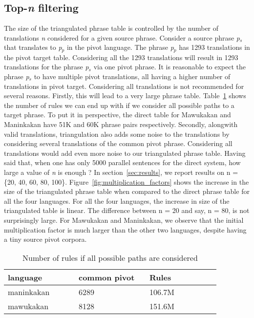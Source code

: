 \subsection{Top-\emph{n} filtering}
\label{subsec:topn}
 The size of the triangulated phrase table is controlled by the number of translations \emph{n} considered for a given source phrase. Consider a source phrase \emph{p$_s$} that translates to \emph{p$_p$} in the pivot language. The phrase \emph{p$_p$} has 1293 translations in the pivot target table. Considering all the 1293 translations will result in 1293 translations for the phrase \emph{p$_s$} via one pivot phrase. It is reasonable to expect the phrase \emph{p$_s$} to have multiple pivot translations, all having a higher number of translations in pivot target. Considering all translations is not recommended for several reasons. Firstly, this will lead to a very large phrase table. Table~\ref{table:allrules} shows the number of rules we can end up with if we consider all possible paths to a target phrase. To put it in perspective, the direct table for Mawukakan and Maninkakan have 51K and 60K phrase pairs respectively. Secondly, alongwith valid translations, triangulation also adds some noise to the translations by considering several translations of the common pivot phrase. Considering all translations would add even more noise to our triangulated phrase table. Having said that, when one has only 5000 parallel sentences for the direct system, how large a value of \emph{n} is enough ? In section~\ref{sec:results}, we report results on n = \{20, 40, 60, 80, 100\}. Figure~\ref{fig:multiplication_factors} shows the increase in the size of the triangulated phrase table when compared to the direct phrase table for all the four languages. For all the four languages, the increase in size of the triangulated table is linear. The difference between n = 20 and say, n = 80, is not surprisingly large. For Mawukakan and Maninkakan, we observe that the initial multiplication factor is much larger than the other two languages, despite having a tiny source pivot corpora.

        \begin{table}
                \footnotesize
                \small
                \centering

                \begin{tabular}{p{0.3\linewidth}p{0.3\linewidth}p{0.3\linewidth}}
                \toprule
                language & common pivot & Rules \\
                \toprule
                maninkakan & 6289 & 106.7M \\
                mawukakan & 8128 & 151.6M \\
                \bottomrule
                \end{tabular}
                \caption{Number of rules if all possible paths are considered}
                \label{table:allrules}
        \end{table}


